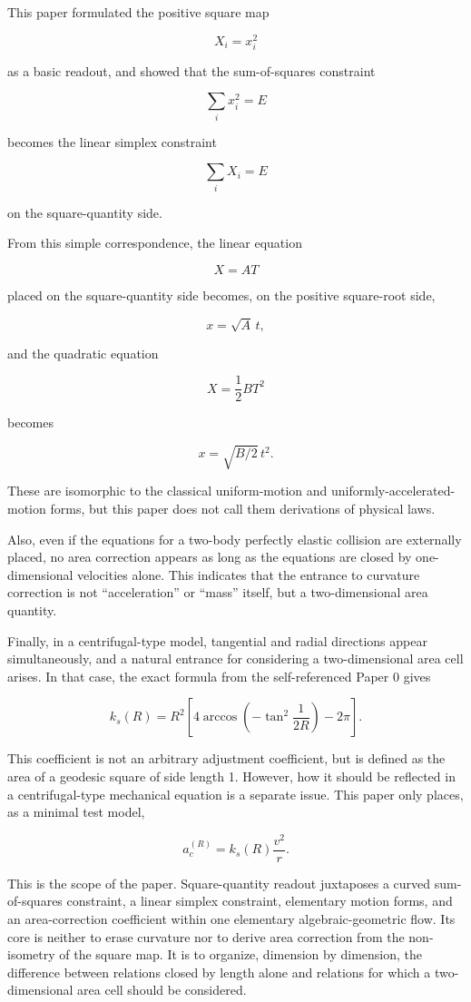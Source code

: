 \documentclass[
]{ltjsarticle}
\begin{document}
This paper formulated the positive square map

\[
X_i=x_i^2
\]

as a basic readout, and showed that the sum-of-squares constraint

\[
\sum_i x_i^2=E
\]

becomes the linear simplex constraint

\[
\sum_i X_i=E
\]

on the square-quantity side.

From this simple correspondence, the linear equation

\[
X=A T
\]

placed on the square-quantity side becomes, on the positive square-root
side,

\[
x=\sqrt{A}\,t,
\]

and the quadratic equation

\[
X=\frac{1}{2} B T^2
\]

becomes

\[
x=\sqrt{B/2}\,t^2.
\]

These are isomorphic to the classical uniform-motion and
uniformly-accelerated-motion forms, but this paper does not call them
derivations of physical laws.

Also, even if the equations for a two-body perfectly elastic collision
are externally placed, no area correction appears as long as the
equations are closed by one-dimensional velocities alone. This indicates
that the entrance to curvature correction is not ``acceleration'' or
``mass'' itself, but a two-dimensional area quantity.

Finally, in a centrifugal-type model, tangential and radial directions
appear simultaneously, and a natural entrance for considering a
two-dimensional area cell arises. In that case, the exact formula from
the self-referenced Paper 0 gives

\[
k_s(R)
=
R^2
\left[
4\arccos\!\left(-\tan^2\frac{1}{2R}\right)-2\pi
\right].
\]

This coefficient is not an arbitrary adjustment coefficient, but is
defined as the area of a geodesic square of side length 1. However, how
it should be reflected in a centrifugal-type mechanical equation is a
separate issue. This paper only places, as a minimal test model,

\[
a_c^{(R)}=k_s(R)\frac{v^2}{r}.
\]

This is the scope of the paper. Square-quantity readout juxtaposes a
curved sum-of-squares constraint, a linear simplex constraint,
elementary motion forms, and an area-correction coefficient within one
elementary algebraic-geometric flow. Its core is neither to erase
curvature nor to derive area correction from the non-isometry of the
square map. It is to organize, dimension by dimension, the difference
between relations closed by length alone and relations for which a
two-dimensional area cell should be considered.
\end{document}
